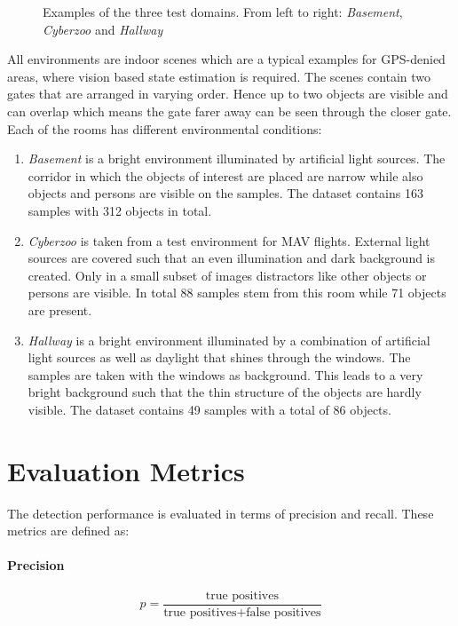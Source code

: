 \begin{figure}
\begin{minipage}{0.3\textwidth}
\end{minipage}
\caption{Examples of the three test domains. From left to right: \textit{Basement}, \textit{Cyberzoo} and \textit{Hallway}}
\label{fig:example_real_set}
\end{figure}

All environments are indoor scenes which are a typical examples for GPS-denied areas, where vision based state estimation is required. The scenes contain two gates that are arranged in varying order. Hence up to two objects are visible and can overlap which means the gate farer away can be seen through the closer gate. Each of the rooms has different environmental conditions:
\begin{enumerate}
	\item \textit{Basement} is a bright environment illuminated by artificial light sources. The corridor in which the objects of interest are placed are narrow while also objects and persons are visible on the samples. The dataset contains 163 samples with 312 objects in total.
	\item \textit{Cyberzoo} is taken from a test environment for \ac{MAV} flights. External light sources are covered such that an even illumination and dark background is created. Only in a small subset of images distractors like other objects or persons are visible. In total 88 samples stem from this room while 71 objects are present.
	\item \textit{Hallway} is a bright environment illuminated by a combination of artificial light sources as well as daylight that shines through the windows. The samples are taken with the windows as background. This leads to a very bright background such that the thin structure of the objects are hardly visible. The dataset contains 49 samples with a total of 86 objects.
\end{enumerate}

\section{Evaluation Metrics}

The detection performance is evaluated in terms of precision and recall. These metrics are defined as:

\paragraph{Precision}
$$p = \frac{\text{true positives}}{\text{true positives} + \text{false positives}}$$

